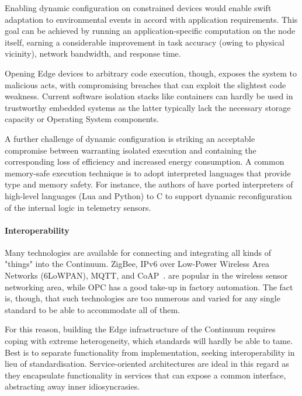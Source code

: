 Enabling dynamic configuration on constrained devices would enable swift adaptation to environmental events in accord with application requirements. 
This goal can be achieved by running an application-specific computation on the node itself, earning a considerable improvement in task accuracy (owing to physical vicinity), network bandwidth, and response time.

Opening Edge devices to arbitrary code execution, though, exposes the system to malicious acts, with compromising breaches that can exploit the slightest code weakness.
Current software isolation stacks like containers can hardly be used in trustworthy embedded systems as the latter typically lack the necessary storage capacity or Operating System components.

A further challenge of dynamic configuration is striking an acceptable compromise between warranting isolated execution and containing the corresponding loss of efficiency and increased energy consumption. 
A common memory-safe execution technique is to adopt interpreted languages that provide type and memory safety. 
For instance, the authors of \cite{brzoza2016embedded} have ported interpreters of high-level languages (Lua and Python) to C to support dynamic reconfiguration of the internal logic in telemetry sensors.

\paragraph{Interoperability}
\label{sec:interoperability}

Many technologies are available for connecting and integrating all kinds of "things" into the Continuum. 
ZigBee, IPv6 over Low-Power Wireless Area Networks (6LoWPAN), MQTT, and CoAP~\cite{naik2017choice}. are popular in the wireless sensor networking area, while OPC \cite{gruner2016restful} has a good take-up in factory automation. 
The fact is, though, that such technologies are too numerous and varied for any single standard to be able to accommodate all of them.

For this reason, building the Edge infrastructure of the Continuum requires coping with extreme heterogeneity, which standards will hardly be able to tame.
Best is to separate functionality from implementation, seeking interoperability in lieu of standardisation. Service-oriented architectures are ideal in this regard as they encapsulate functionality in services that can expose a common interface, abstracting away inner idiosyncrasies.

